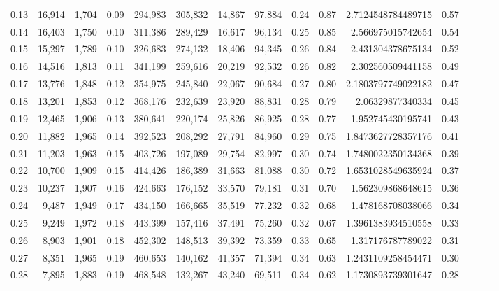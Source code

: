 \begin{tabular}{rrrrrrrrrrrrrrr}
0.13 &  16,914 &  1,704 &  0.09 &  294,983 &  305,832 &   14,867 &   97,884 &  0.24 &  0.87 &     2.7124548784489715 &      0.57 \\
0.14 &  16,403 &  1,750 &  0.10 &  311,386 &  289,429 &   16,617 &   96,134 &  0.25 &  0.85 &      2.566975015742654 &      0.54 \\
0.15 &  15,297 &  1,789 &  0.10 &  326,683 &  274,132 &   18,406 &   94,345 &  0.26 &  0.84 &      2.431304378675134 &      0.52 \\
0.16 &  14,516 &  1,813 &  0.11 &  341,199 &  259,616 &   20,219 &   92,532 &  0.26 &  0.82 &      2.302560509441158 &      0.49 \\
0.17 &  13,776 &  1,848 &  0.12 &  354,975 &  245,840 &   22,067 &   90,684 &  0.27 &  0.80 &     2.1803797749022182 &      0.47 \\
0.18 &  13,201 &  1,853 &  0.12 &  368,176 &  232,639 &   23,920 &   88,831 &  0.28 &  0.79 &       2.06329877340334 &      0.45 \\
0.19 &  12,465 &  1,906 &  0.13 &  380,641 &  220,174 &   25,826 &   86,925 &  0.28 &  0.77 &      1.952745430195741 &      0.43 \\
0.20 &  11,882 &  1,965 &  0.14 &  392,523 &  208,292 &   27,791 &   84,960 &  0.29 &  0.75 &     1.8473627728357176 &      0.41 \\
0.21 &  11,203 &  1,963 &  0.15 &  403,726 &  197,089 &   29,754 &   82,997 &  0.30 &  0.74 &     1.7480022350134368 &      0.39 \\
0.22 &  10,700 &  1,909 &  0.15 &  414,426 &  186,389 &   31,663 &   81,088 &  0.30 &  0.72 &     1.6531028549635924 &      0.37 \\
0.23 &  10,237 &  1,907 &  0.16 &  424,663 &  176,152 &   33,570 &   79,181 &  0.31 &  0.70 &      1.562309868648615 &      0.36 \\
0.24 &   9,487 &  1,949 &  0.17 &  434,150 &  166,665 &   35,519 &   77,232 &  0.32 &  0.68 &      1.478168708038066 &      0.34 \\
0.25 &   9,249 &  1,972 &  0.18 &  443,399 &  157,416 &   37,491 &   75,260 &  0.32 &  0.67 &     1.3961383934510558 &      0.33 \\
0.26 &   8,903 &  1,901 &  0.18 &  452,302 &  148,513 &   39,392 &   73,359 &  0.33 &  0.65 &      1.317176787789022 &      0.31 \\
0.27 &   8,351 &  1,965 &  0.19 &  460,653 &  140,162 &   41,357 &   71,394 &  0.34 &  0.63 &     1.2431109258454471 &      0.30 \\
0.28 &   7,895 &  1,883 &  0.19 &  468,548 &  132,267 &   43,240 &   69,511 &  0.34 &  0.62 &     1.1730893739301647 &      0.28 \\

\end{tabular}
